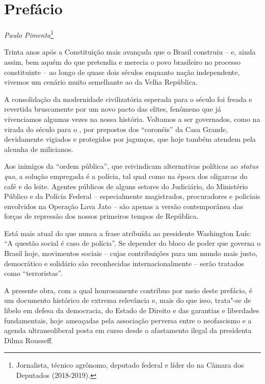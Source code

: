 \chapter*{Prefácio}


\begin{flushright}
\emph{Paulo Pimenta}\footnote{Jornalista, técnico agrônomo, deputado
federal e líder do  na Câmara dos Deputados (2018-2019).}
\end{flushright}

Trinta anos após a Constituição mais avançada que o Brasil construiu --
e, ainda assim, bem aquém do que pretendia e merecia o povo brasileiro
no processo constituinte -- ao longo de quase dois séculos enquanto
nação independente, vivemos um cenário muito semelhante ao da Velha
República.

A consolidação da modernidade civilizatória esperada para o século 
foi freada e revertida bruscamente por um novo pacto das elites,
fenômeno que já vivenciamos algumas vezes na nossa história. Voltamos a
ser governados, como na virada do século  para o , por prepostos
dos ``coronéis'' da Casa Grande, devidamente vigiados e protegidos por
jagunços, que hoje também atendem pela alcunha de milicianos.

Aos inimigos da ``ordem pública'', que reivindicam alternativas
políticas ao \emph{status quo}, a solução empregada é a polícia, tal
qual como na época dos oligarcas do café e do leite. Agentes públicos de
alguns setores do Judiciário, do Ministério Público e da Polícia Federal
-- especialmente magistrados, procuradores e policiais envolvidos na
Operação Lava Jato -- são apenas a versão contemporânea das forças de
repressão dos nossos primeiros tempos de República.

Está mais atual do que nunca a frase atribuída ao presidente Washington
Luís: ``A questão social é caso de polícia''. Se depender do bloco de
poder que governa o Brasil hoje, movimentos sociais -- cujas
contribuições para um mundo mais justo, democrático e solidário são
reconhecidas internacionalmente -- serão tratados como ``terroristas''.

A presente obra, com a qual honrosamente contribuo por meio deste
prefácio, é um documento histórico de extrema relevância e, mais do que
isso, trata"-se de libelo em defesa da democracia, do Estado de Direito e
das garantias e liberdades fundamentais, hoje ameaçadas pela associação
perversa entre o neofascismo e a agenda ultraneoliberal posta em curso
desde o afastamento ilegal da presidenta Dilma Rousseff.

